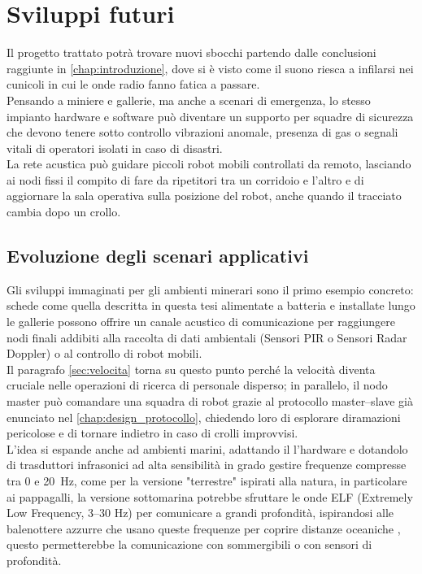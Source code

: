 \chapter{Sviluppi futuri}
\label{chap:sviluppi_futuri}

Il progetto trattato potrà trovare nuovi sbocchi partendo dalle conclusioni raggiunte in \autoref{chap:introduzione},
 dove si è visto come il suono riesca a infilarsi nei cunicoli in cui le onde radio fanno fatica a passare.\\ 
Pensando a miniere e gallerie, ma anche a scenari di emergenza, lo stesso impianto hardware e software può diventare un supporto
 per squadre di sicurezza che devono tenere sotto controllo vibrazioni anomale, presenza di gas o segnali vitali di operatori isolati in caso di disastri.  \\
La rete acustica può guidare piccoli robot mobili controllati da remoto, lasciando ai nodi fissi il compito di fare da ripetitori tra un corridoio
 e l'altro e di aggiornare la sala operativa sulla posizione del robot, anche quando il tracciato cambia dopo un crollo.

\section{Evoluzione degli scenari applicativi}
\label{sec:scenari_applicativi}

Gli sviluppi immaginati per gli ambienti minerari sono il primo esempio concreto: schede come quella descritta in questa tesi alimentate a batteria e installate 
lungo le gallerie possono offrire un canale acustico di comunicazione per raggiungere nodi finali addibiti alla raccolta di dati ambientali (Sensori PIR o Sensori Radar Doppler)
 o al controllo di robot mobili. \\
 Il paragrafo \autoref{sec:velocita} torna su questo punto perché la velocità diventa cruciale nelle operazioni di ricerca di personale disperso;
  in parallelo, il nodo master può comandare una squadra di robot grazie al protocollo master--slave già enunciato nel \autoref{chap:design_protocollo},
   chiedendo loro di esplorare diramazioni pericolose e di tornare indietro in caso di crolli improvvisi. \\

L'idea si espande anche ad ambienti marini, adattando il l'hardware e dotandolo di trasduttori infrasonici ad alta sensibilità in grado 
gestire frequenze compresse tra 0 e \SI{20}{\hertz}, come per la versione "terrestre" ispirati alla natura, in particolare ai pappagalli, la versione sottomarina
potrebbe sfruttare le onde ELF (Extremely Low Frequency, 3--30 Hz) per comunicare a grandi profondità, ispirandosi alle balenottere azzurre che 
usano queste frequenze per coprire distanze oceaniche \citep[sec.~2]{Dziak2017}, questo permetterebbe la comunicazione con sommergibili o con sensori di profondità. \\

